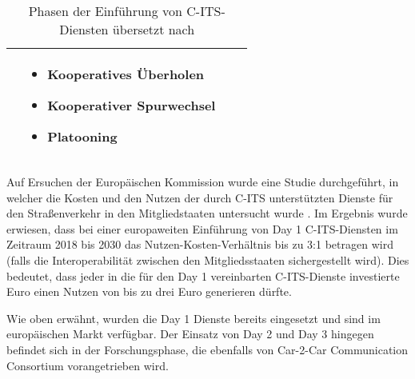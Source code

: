 \begin{table}[h!]
\begin{tabular}{|m{4em}|m{10em}|m{10em}|m{8em}|}
\begin{itemize}[leftmargin=0.3cm]
	\end{itemize} & 
	\begin{itemize}[leftmargin=0.3cm] \item Kooperatives Überholen
	
	\item Kooperativer Spurwechsel
	
	\item Platooning
	
	\end{itemize} \\ 
		\hline
	\end{tabular}
	\caption{Phasen der Einführung von C-ITS-Diensten übersetzt nach \cite{Car2Car}}
	\label{table:1}
\end{table}

Auf Ersuchen der Europäischen Kommission wurde eine Studie durchgeführt, in welcher die Kosten und den Nutzen der durch C-ITS unterstützten Dienste für den Straßenverkehr in den Mitgliedstaaten untersucht wurde \cite{StudyDeployment}. Im Ergebnis wurde erwiesen, dass bei einer europaweiten Einführung von Day 1 C-ITS-Diensten im Zeitraum 2018 bis 2030 das Nutzen-Kosten-Verhältnis bis zu 3:1 betragen wird (falls die Interoperabilität zwischen den Mitgliedsstaaten sichergestellt wird). Dies bedeutet, dass jeder in die für den Day 1 vereinbarten C-ITS-Dienste investierte Euro einen Nutzen von bis zu drei Euro generieren dürfte. 

Wie oben erwähnt, wurden die Day 1 Dienste bereits eingesetzt und sind im europäischen Markt verfügbar. Der Einsatz von Day 2 und Day 3 hingegen befindet sich in der Forschungsphase, die ebenfalls von Car-2-Car Communication Consortium vorangetrieben wird. 



